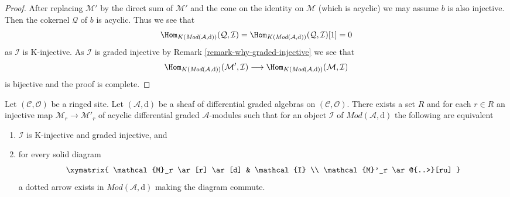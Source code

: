 \begin{proof}
After replacing $\mathcal{M}'$ by the direct sum of $\mathcal{M}'$
and the cone on the identity on $\mathcal{M}$ (which is acyclic)
we may assume $b$ is also injective. Then the cokernel $\mathcal{Q}$
of $b$ is acyclic. Thus we see that
$$
\Hom_{K(\textit{Mod}(\mathcal{A}, \text{d}))}(\mathcal{Q}, \mathcal{I}) =
\Hom_{K(\textit{Mod}(\mathcal{A}, \text{d}))}(\mathcal{Q}, \mathcal{I})[1] = 0
$$
as $\mathcal{I}$ is K-injective. As $\mathcal{I}$ is graded injective
by Remark \ref{remark-why-graded-injective}
we see that
$$
\Hom_{K(\textit{Mod}(\mathcal{A}, \text{d}))}(\mathcal{M}', \mathcal{I})
\longrightarrow
\Hom_{K(\textit{Mod}(\mathcal{A}, \text{d}))}(\mathcal{M}, \mathcal{I})
$$
is bijective and the proof is complete.
\end{proof}

\begin{lemma}
\label{lemma-better-set-of-monos}
Let $(\mathcal{C}, \mathcal{O})$ be a ringed site.
Let $(\mathcal{A}, \text{d})$
be a sheaf of differential graded algebras on $(\mathcal{C}, \mathcal{O})$.
There exists a set $R$ and for each $r \in R$ an injective map
$\mathcal{M}_r \to \mathcal{M}'_r$ of
acyclic differential graded $\mathcal{A}$-modules
such that for an object $\mathcal{I}$ of $\textit{Mod}(\mathcal{A}, \text{d})$
the following are equivalent
\begin{enumerate}
\item $\mathcal{I}$ is K-injective and graded injective, and
\item for every solid diagram
$$
\xymatrix{
\mathcal{M}_r \ar[r] \ar[d] & \mathcal{I} \\
\mathcal{M}'_r \ar@{..>}[ru]
}
$$
a dotted arrow exists in $\textit{Mod}(\mathcal{A}, \text{d})$
making the diagram commute.
\end{enumerate}
\end{lemma}

